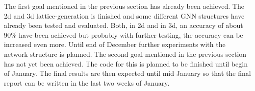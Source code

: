 The first goal mentioned in the previous section has already been achieved. 
The 2d and 3d lattice-generation is finished and some different GNN structures have already been tested and evaluated.
Both, in 2d and in 3d, an accuracy of about 90\% have been achieved but probably with further testing, the accuracy can be increased even more.
Until end of December further experiments with the network structure is planned. 
The second goal mentioned in the previous section has not yet been achieved. The code for this is planned to be finished until begin of January.
The final results are then expected until mid January so that the final report can be written in the last two weeks of January.  